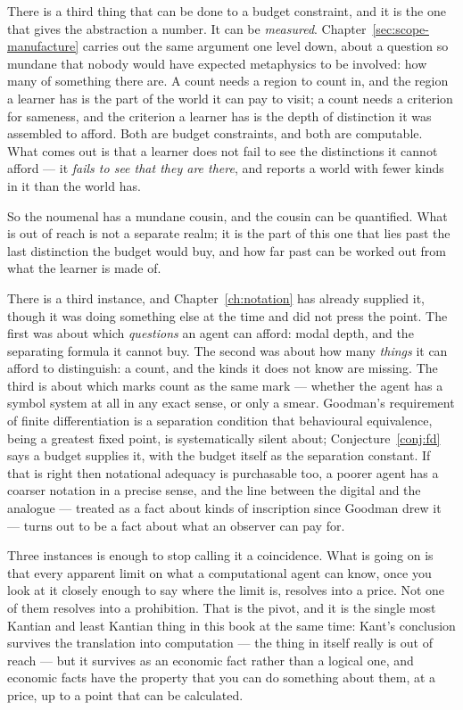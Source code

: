 There is a third thing that can be done to a budget constraint, and
it is the one that gives the abstraction a number.
It can be \emph{measured}.
Chapter~\ref{sec:scope-manufacture} carries out the same argument
one level down, about a question so mundane that nobody would have
expected metaphysics to be involved: how many of something there
are.
A count needs a region to count in, and the region a learner has is
the part of the world it can pay to visit; a count needs a criterion
for sameness, and the criterion a learner has is the depth of
distinction it was assembled to afford.
Both are budget constraints, and both are computable.
What comes out is that a learner does not fail to see the
distinctions it cannot afford --- it \emph{fails to see that they
are there}, and reports a world with fewer kinds in it than the
world has.

So the noumenal has a mundane cousin, and the cousin can be
quantified. What is out of reach is not a separate realm; it is the
part of this one that lies past the last distinction the budget
would buy, and how far past can be worked out from what the learner
is made of.

There is a third instance, and Chapter~\ref{ch:notation} has
already supplied it, though it was doing something else at the time
and did not press the point.
The first was about which \emph{questions} an agent can afford:
modal depth, and the separating formula it cannot buy.
The second was about how many \emph{things} it can afford to
distinguish: a count, and the kinds it does not know are missing.
The third is about which marks count as the same mark --- whether
the agent has a symbol system at all in any exact sense, or only a
smear.
Goodman's requirement of finite differentiation is a separation
condition that behavioural equivalence, being a greatest fixed
point, is systematically silent about;
Conjecture~\ref{conj:fd} says a budget supplies it, with the budget
itself as the separation constant.
If that is right then notational adequacy is purchasable too, a
poorer agent has a coarser notation in a precise sense, and the
line between the digital and the analogue --- treated as a fact
about kinds of inscription since Goodman drew it --- turns out to
be a fact about what an observer can pay for.

Three instances is enough to stop calling it a coincidence.
What is going on is that every apparent limit on what a
computational agent can know, once you look at it closely enough to
say where the limit is, resolves into a price.
Not one of them resolves into a prohibition.
That is the pivot, and it is the single most Kantian and least
Kantian thing in this book at the same time: Kant's conclusion
survives the translation into computation --- the thing in itself
really is out of reach --- but it survives as an economic fact
rather than a logical one, and economic facts have the property
that you can do something about them, at a price, up to a point
that can be calculated.

